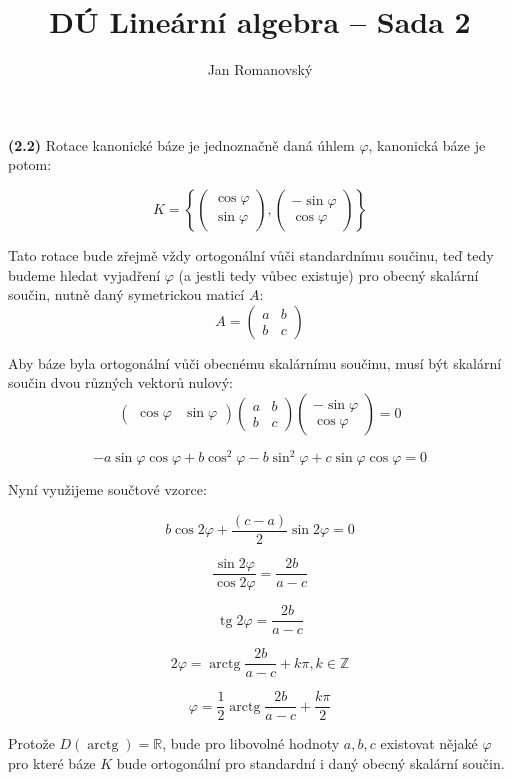 \documentclass{article}
\title{DÚ Lineární algebra -- Sada 2}
\author{Jan Romanovský}
\DeclareMathOperator{\tg}{tg}
\DeclareMathOperator{\arctg}{arctg}
\begin{document}
\maketitle

\textbf{(2.2)} Rotace kanonické báze je jednoznačně daná úhlem $\varphi$, kanonická báze je potom:

$$K = \left\{\begin{pmatrix}
  \cos \varphi \\ \sin \varphi
\end{pmatrix}, \begin{pmatrix}
  -\sin \varphi \\ \cos \varphi
\end{pmatrix}\right\}$$

Tato rotace bude zřejmě vždy ortogonální vůči standardnímu součinu, teď tedy budeme hledat vyjadření $\varphi$ (a jestli tedy vůbec existuje) pro obecný skalární součin, nutně daný symetrickou maticí $A$: $$A=\begin{pmatrix}
  a & b \\ b & c
\end{pmatrix}$$

Aby báze byla ortogonální vůči obecnému skalárnímu součinu, musí být skalární součin dvou různých vektorů nulový:
$$\begin{pmatrix}
  \cos \varphi & \sin \varphi
\end{pmatrix}\begin{pmatrix}
  a & b \\ b & c
\end{pmatrix}\begin{pmatrix}
  -\sin \varphi \\ \cos \varphi
\end{pmatrix} = 0$$

$$-a\sin \varphi\cos \varphi + b\cos^2 \varphi - b \sin^2 \varphi+c\sin \varphi\cos \varphi = 0$$

Nyní využijeme součtové vzorce:

$$b \cos 2\varphi + \frac{(c-a)}{2}\sin 2\varphi = 0$$

$$\frac{\sin 2\varphi}{\cos 2\varphi}=\frac{2b}{a-c}$$

$$\tg 2\varphi = \frac{2b}{a-c}$$

$$2\varphi = \arctg \frac{2b}{a-c} + k\pi, k \in \mathbb Z$$

$$\varphi = \frac{1}{2} \arctg \frac{2b}{a-c} + \frac{k\pi}{2}$$

Protože $D(\arctg) = \mathbb R$, bude pro libovolné hodnoty $a, b, c$ existovat nějaké $\varphi$ pro které báze $K$ bude ortogonální pro standardní i daný obecný skalární součin.
\end{document}
